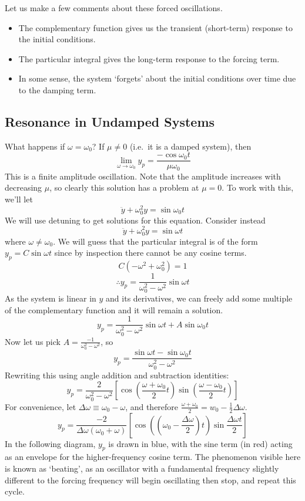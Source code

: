 \noindent Let us make a few comments about these forced oscillations.
\begin{itemize}
	\item The complementary function gives us the transient (short-term) response to the initial conditions.
	\item The particular integral gives the long-term response to the forcing term.
	\item In some sense, the system `forgets' about the initial conditions over time due to the damping term.
\end{itemize}

\subsection{Resonance in Undamped Systems}
What happens if \(\omega = \omega_0\)? If \(\mu \neq 0\) (i.e.\ it is a damped system), then
\[ \lim_{\omega \to \omega_0} y_p = \frac{-\cos\omega_0 t}{\mu\omega_0} \]
This is a finite amplitude oscillation. Note that the amplitude increases with decreasing \(\mu\), so clearly this solution has a problem at \(\mu = 0\). To work with this, we'll let
\[ \ddot y + \omega_0^2 y = \sin\omega_0 t \]
We will use detuning to get solutions for this equation. Consider instead
\[ \ddot y + \omega_0^2 y = \sin\omega t \]
where \(\omega \neq \omega_0\). We will guess that the particular integral is of the form \(y_p = C\sin\omega t\) since by inspection there cannot be any cosine terms.
\[ C(-\omega^2 + \omega_0^2) = 1 \]
\[ \therefore y_p = \frac{1}{\omega_0^2 - \omega^2}\sin\omega t \]
As the system is linear in \(y\) and its derivatives, we can freely add some multiple of the complementary function and it will remain a solution.
\[ y_p = \frac{1}{\omega_0^2 - \omega^2}\sin\omega t + A \sin\omega_0 t \]
Now let us pick \(A = \frac{-1}{\omega_0^2 - \omega^2}\), so
\[ y_p = \frac{\sin \omega t - \sin \omega_0 t}{\omega_0^2 - \omega^2} \]
Rewriting this using angle addition and subtraction identities:
\[ y_p = \frac{2}{\omega_0^2 - \omega^2}\left[ \cos\left( \frac{\omega + \omega_0}{2}t \right) \sin\left( \frac{\omega - \omega_0}{2}t \right) \right] \]
For convenience, let \(\Delta\omega \equiv \omega_0 - \omega\), and therefore \(\frac{\omega + \omega_0}{2} = w_0 - \frac{1}{2}\Delta\omega\).
\[ y_p = \frac{-2}{\Delta\omega(\omega_0 + \omega)}\left[ \cos\left( \left(\omega_0 - \frac{\Delta\omega}{2}\right)t \right) \sin\frac{\Delta\omega t}{2} \right] \]
In the following diagram, \(y_p\) is drawn in blue, with the sine term (in red) acting as an envelope for the higher-frequency cosine term. The phenomenon visible here is known as `beating', as an oscillator with a fundamental frequency slightly different to the forcing frequency will begin oscillating then stop, and repeat this cycle.\medskip

